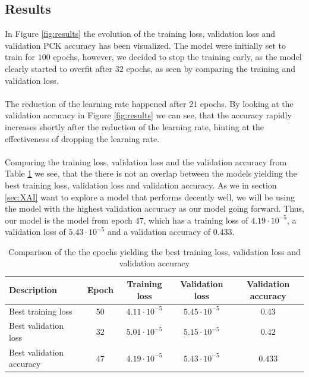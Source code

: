 \documentclass[./main.tex]{subfiles}
\begin{document}
\subsection{Results}
In Figure \ref{fig:results} the evolution of the training loss, validation loss and validation PCK accuracy has been visualized. The model were initially set to train for $100$ epochs, however, we decided to stop the training early, as the model clearly started to overfit after $32$ epochs, as seen by comparing the training and validation loss.
\\
\\
The reduction of the learning rate happened after $21$ epochs. By looking at the validation accuracy in Figure \ref{fig:results} we can see, that the accuracy rapidly increases shortly after the reduction of the learning rate, hinting at the effectiveness of dropping the learning rate. 
\\
\\
Comparing the training loss, validation loss and the validation accuracy from Table \ref{tab:results} we see, that the there is not an overlap between the models yielding the best training loss, validation loss and validation accuracy. As we in section \ref{sec:XAI} want to explore a model that performs decently well, we will be using the model with the highest validation accuracy as our model going forward. Thus, our model is the model from epoch $47$, which has a training loss of $4.19 \cdot 10^{-5}$, a validation loss of $5.43 \cdot 10^{-5}$ and a validation accuracy of $0.433$.
\begin{table}[b]
    \centering
    \begin{tabular}{|l|c|c|c|c|}
        \hline
        \textbf{Description} & \textbf{Epoch} & \textbf{Training loss} & \textbf{Validation loss} & \textbf{Validation accuracy} \\
        \hline
        Best training loss & $50$ & $4.11 \cdot 10^{-5}$ & $5.45 \cdot 10^{-5}$ & $0.43$ \\
        \hline
        Best validation loss & $32$ & $5.01 \cdot 10^{-5}$ & $5.15 \cdot 10^{-5}$ & $0.42$ \\
        \hline
        Best validation accuracy & $47$ & $4.19 \cdot 10^{-5}$ & $5.43 \cdot 10^{-5}$  & $0.433$ \\
        \hline
    \end{tabular}
    \caption{Comparison of the the epochs yielding the best training loss, validation loss and validation accuracy}
    \label{tab:results}
\end{table}
\end{document}
